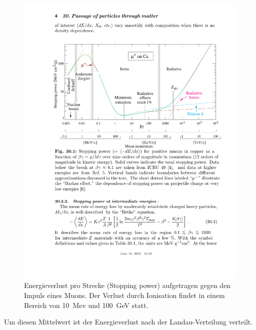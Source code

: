 \begin{figure}
\centering
\includegraphics[scale=0.7]{./input/bethe.pdf}\caption{Energieverlust pro Strecke (Stopping power) aufgetragen gegen den Impuls eines Muons. Der Verlust durch Ionisation findet in einem Bereich von 10~Mev und 100~GeV statt\cite{Passage_through_matter}.}\label{fig:bethe}
\end{figure}
Um diesen Mittelwert ist der Energieverlust nach der Landau-Verteilung verteilt.
